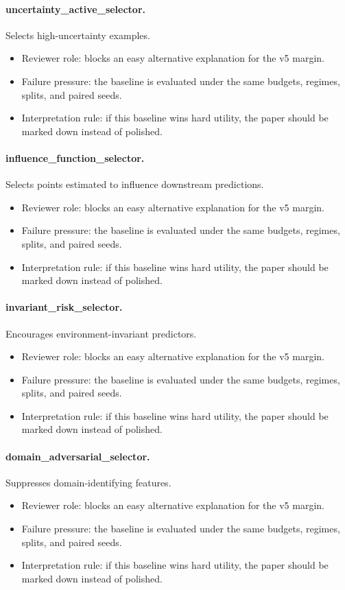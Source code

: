 \documentclass{article}
\begin{document}
\paragraph{uncertainty\_active\_selector.} Selects high-uncertainty examples.
\begin{itemize}
\item Reviewer role: blocks an easy alternative explanation for the v5 margin.
\item Failure pressure: the baseline is evaluated under the same budgets, regimes, splits, and paired seeds.
\item Interpretation rule: if this baseline wins hard utility, the paper should be marked down instead of polished.
\end{itemize}
\paragraph{influence\_function\_selector.} Selects points estimated to influence downstream predictions.
\begin{itemize}
\item Reviewer role: blocks an easy alternative explanation for the v5 margin.
\item Failure pressure: the baseline is evaluated under the same budgets, regimes, splits, and paired seeds.
\item Interpretation rule: if this baseline wins hard utility, the paper should be marked down instead of polished.
\end{itemize}
\paragraph{invariant\_risk\_selector.} Encourages environment-invariant predictors.
\begin{itemize}
\item Reviewer role: blocks an easy alternative explanation for the v5 margin.
\item Failure pressure: the baseline is evaluated under the same budgets, regimes, splits, and paired seeds.
\item Interpretation rule: if this baseline wins hard utility, the paper should be marked down instead of polished.
\end{itemize}
\paragraph{domain\_adversarial\_selector.} Suppresses domain-identifying features.
\begin{itemize}
\item Reviewer role: blocks an easy alternative explanation for the v5 margin.
\item Failure pressure: the baseline is evaluated under the same budgets, regimes, splits, and paired seeds.
\item Interpretation rule: if this baseline wins hard utility, the paper should be marked down instead of polished.
\end{itemize}
\end{document}
